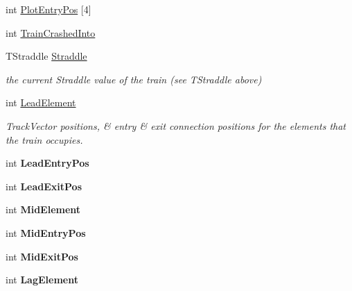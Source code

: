 \begin{DoxyCompactItemize}
int \mbox{\hyperlink{class_t_train_ac4ff3ae93a80d230d1ddcb992b0b546a}{Plot\+Entry\+Pos}} \mbox{[}4\mbox{]}
\item 
int \mbox{\hyperlink{class_t_train_ad7644b30da32d0d9e6541ba7629a4a35}{Train\+Crashed\+Into}}
\item 
\mbox{\label{class_t_train_aba7fc74449b392035805ecc4f2bc1650}} 
T\+Straddle \mbox{\hyperlink{class_t_train_aba7fc74449b392035805ecc4f2bc1650}{Straddle}}
\begin{DoxyCompactList}\small\item\em the current Straddle value of the train (see T\+Straddle above) \end{DoxyCompactList}\item 
\mbox{\label{class_t_train_abba9596f03b731ba4055f4d3591f5b0e}} 
int \mbox{\hyperlink{class_t_train_abba9596f03b731ba4055f4d3591f5b0e}{Lead\+Element}}
\begin{DoxyCompactList}\small\item\em Track\+Vector positions, \& entry \& exit connection positions for the elements that the train occupies. \end{DoxyCompactList}\item 
\mbox{\label{class_t_train_ae5acbf95c32fbf654e4f68417032edad}} 
int {\bfseries Lead\+Entry\+Pos}
\item 
\mbox{\label{class_t_train_af92045cb9d4cb0fa368d1541e4fb2780}} 
int {\bfseries Lead\+Exit\+Pos}
\item 
\mbox{\label{class_t_train_a6f92853cac4bf9f463effe07c2432270}} 
int {\bfseries Mid\+Element}
\item 
\mbox{\label{class_t_train_a9594b786d0a6d35cfa82b1084f90c82f}} 
int {\bfseries Mid\+Entry\+Pos}
\item 
\mbox{\label{class_t_train_a6c0d3ad2ffe11093982406e5d449bbd1}} 
int {\bfseries Mid\+Exit\+Pos}
\item 
\mbox{\label{class_t_train_ab2b55af1125e9cd1dcbad6d890a33edb}} 
int {\bfseries Lag\+Element}
\item 
\mbox{\label{class_t_train_a8d164779b76b56ab0508197280cb0180}} 

\end{DoxyCompactItemize}
